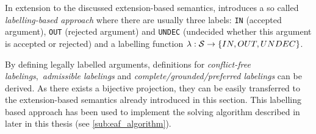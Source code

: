 In extension to the discussed extension-based semantics, \cite{liao} introduces a so called \textit{labelling-based approach} where there are usually three labels: \texttt{IN} (accepted argument), \texttt{OUT} (rejected argument) and \texttt{UNDEC} (undecided whether this argument is accepted or rejected) and a labelling function $\lambda: \S \rightarrow \{IN, OUT, UNDEC\}$.

By defining legally labelled arguments, definitions for \textit{conflict-free labelings},~\textit{admissible labelings} and \textit{complete/grounded/preferred labelings} can be derived. As there exists a bijective projection, they can be easily transferred to the extension-based semantics already introduced in this section. This labelling based approach has been used to implement the solving algorithm described in \cite{Modgil2009Labellings} later in this thesis (see \autoref{sub:eaf_algorithm}).

